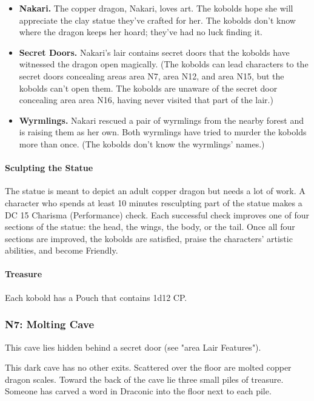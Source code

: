 \documentclass[letterpaper, 11pt, twocolumn]{dndbook}
\begin{document}
\begin{itemize}
\item \textbf{Nakari.} The copper dragon, Nakari, loves art. The kobolds hope she will appreciate the clay statue they've crafted for her. The kobolds don't know where the dragon keeps her hoard; they've had no luck finding it.
\item \textbf{Secret Doors.} Nakari's lair contains secret doors that the kobolds have witnessed the dragon open magically. (The kobolds can lead characters to the secret doors concealing areas area N7, area N12, and area N15, but the kobolds can't open them. The kobolds are unaware of the secret door concealing area area N16, having never visited that part of the lair.)
\item \textbf{Wyrmlings.} Nakari rescued a pair of wyrmlings from the nearby forest and is raising them as her own. Both wyrmlings have tried to murder the kobolds more than once. (The kobolds don't know the wyrmlings' names.)
\end{itemize}

\paragraph{Sculpting the Statue}

The statue is meant to depict an adult copper dragon but needs a lot of work. A character who spends at least 10 minutes resculpting part of the statue makes a DC 15 Charisma (Performance) check. Each successful check improves one of four sections of the statue: the head, the wings, the body, or the tail. Once all four sections are improved, the kobolds are satisfied, praise the characters' artistic abilities, and become Friendly.

\paragraph{Treasure}

Each kobold has a Pouch that contains 1d12 CP.

\subsubsection{N7: Molting Cave}

This cave lies hidden behind a secret door (see "area Lair Features").

\begin{DndReadAloud}
This dark cave has no other exits. Scattered over the floor are molted copper dragon scales. Toward the back of the cave lie three small piles of treasure. Someone has carved a word in Draconic into the floor next to each pile.
\end{DndReadAloud}
\end{document}
